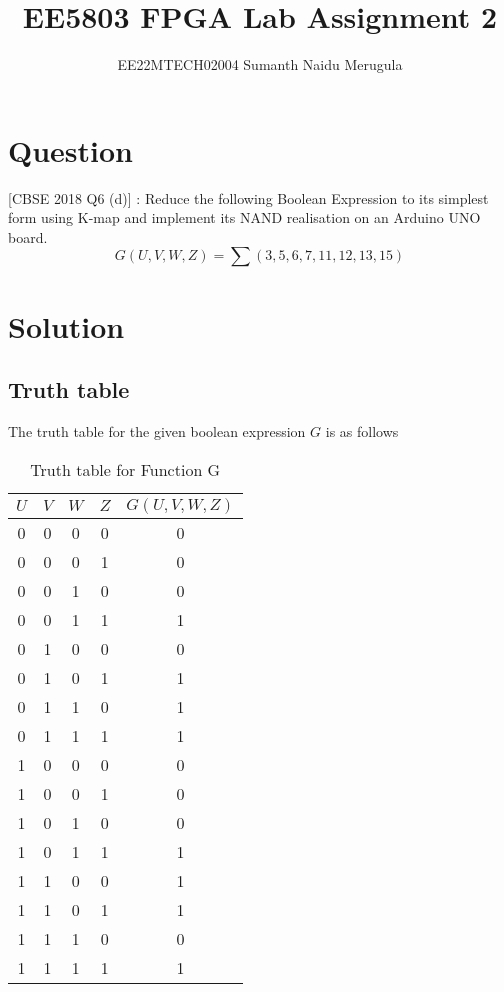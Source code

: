 \documentclass[14pt]{article}
\title{EE5803 FPGA Lab Assignment 2}
\author{EE22MTECH02004  Sumanth Naidu Merugula}
\begin{document}
\maketitle
\section{Question}
[CBSE 2018 Q6 (d)] : Reduce the following Boolean Expression to its simplest form using K-map and implement its NAND realisation on an Arduino UNO board.  
\begin{equation}
G(U,V,W,Z)=\sum(3,5,6,7,11,12,13,15) 
\end{equation}
\section{Solution}
\subsection{Truth table}
The truth table for the given boolean expression $G$ is as follows
\begin{table}[h!]
\centering
\begin{tabular}{|c|c|c|c|c|} 
\hline
$U$ & $V$ & $W$  & $Z$ & $G(U,V,W,Z)$  \\ 
\hline
0 & 0 & 0 & 0 & 0     \\ 
\hline
0 & 0 & 0 & 1 & 0     \\ 
\hline
0 & 0 & 1 & 0 & 0     \\ 
\hline
0 & 0 & 1 & 1 & 1     \\ 
\hline
0 & 1 & 0 & 0 & 0     \\ 
\hline
0 & 1 & 0 & 1 & 1     \\ 
\hline
0 & 1 & 1 & 0 & 1     \\ 
\hline
0 & 1 & 1 & 1 & 1     \\ 
\hline
1 & 0 & 0 & 0 & 0     \\ 
\hline
1 & 0 & 0 & 1 & 0     \\ 
\hline
1 & 0 & 1 & 0 & 0     \\ 
\hline
1 & 0 & 1 & 1 & 1     \\ 
\hline
1 & 1 & 0 & 0 & 1     \\ 
\hline
1 & 1 & 0 & 1 & 1     \\ 
\hline
1 & 1 & 1 & 0 & 0     \\ 
\hline
1 & 1 & 1 & 1 & 1     \\ 
\hline
\end{tabular}
\caption{Truth table for Function G}
\end{table}
\end{document}
